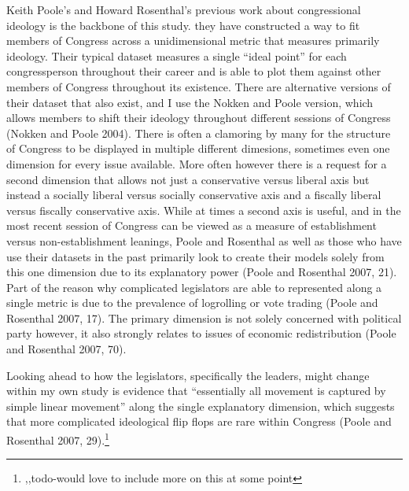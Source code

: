 \documentclass[12pt,twoside]{reedthesis}
\begin{document}
  Keith Poole's and Howard Rosenthal's previous work about congressional
  ideology is the backbone of this study. they have constructed a way to
  fit members of Congress across a unidimensional metric that measures
  primarily ideology. Their typical dataset measures a single ``ideal
  point'' for each congressperson throughout their career and is able to
  plot them against other members of Congress throughout its existence.
  There are alternative versions of their dataset that also exist, and I
  use the Nokken and Poole version, which allows members to shift their
  ideology throughout different sessions of Congress (Nokken and Poole
  2004). There is often a clamoring by many for the structure of Congress
  to be displayed in multiple different dimesions, sometimes even one
  dimension for every issue available. More often however there is a
  request for a second dimension that allows not just a conservative
  versus liberal axis but instead a socially liberal versus socially
  conservative axis and a fiscally liberal versus fiscally conservative
  axis. While at times a second axis is useful, and in the most recent
  session of Congress can be viewed as a measure of establishment versus
  non-establishment leanings, Poole and Rosenthal as well as those who
  have use their datasets in the past primarily look to create their
  models solely from this one dimension due to its explanatory power
  (Poole and Rosenthal 2007, 21). Part of the reason why complicated
  legislators are able to represented along a single metric is due to the
  prevalence of logrolling or vote trading (Poole and Rosenthal 2007, 17).
  The primary dimension is not solely concerned with political party
  however, it also strongly relates to issues of economic redistribution
  (Poole and Rosenthal 2007, 70).
  
  Looking ahead to how the legislators, specifically the leaders, might
  change within my own study is evidence that ``essentially all movement
  is captured by simple linear movement'' along the single explanatory
  dimension, which suggests that more complicated ideological flip flops
  are rare within Congress (Poole and Rosenthal 2007, 29).\footnote{,,todo-would
    love to include more on this at some point}
  
\end{document}
